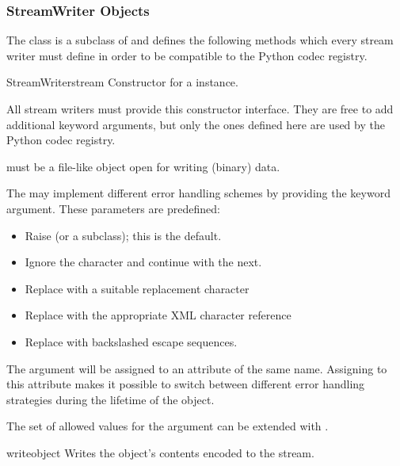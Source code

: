 \subsubsection{StreamWriter Objects \label{stream-writer-objects}}

The  class is a subclass of  and
defines the following methods which every stream writer must define in
order to be compatible to the Python codec registry.

\begin{classdesc}{StreamWriter}{stream}
  Constructor for a  instance. 

  All stream writers must provide this constructor interface. They are
  free to add additional keyword arguments, but only the ones defined
  here are used by the Python codec registry.

   must be a file-like object open for writing (binary)
  data.

  The  may implement different error handling
  schemes by providing the  keyword argument. These
  parameters are predefined:

  \begin{itemize}
    \item {} Raise  (or a subclass);
                          this is the default.
    \item {} Ignore the character and continue with the next.
    \item {} Replace with a suitable replacement character
    \item {} Replace with the appropriate XML
                     character reference
    \item {} Replace with backslashed escape sequences.
  \end{itemize}

  The  argument will be assigned to an attribute of the
  same name. Assigning to this attribute makes it possible to switch
  between different error handling strategies during the lifetime
  of the  object.

  The set of allowed values for the  argument can
  be extended with .
\end{classdesc}

\begin{methoddesc}{write}{object}
  Writes the object's contents encoded to the stream.
\end{methoddesc}


